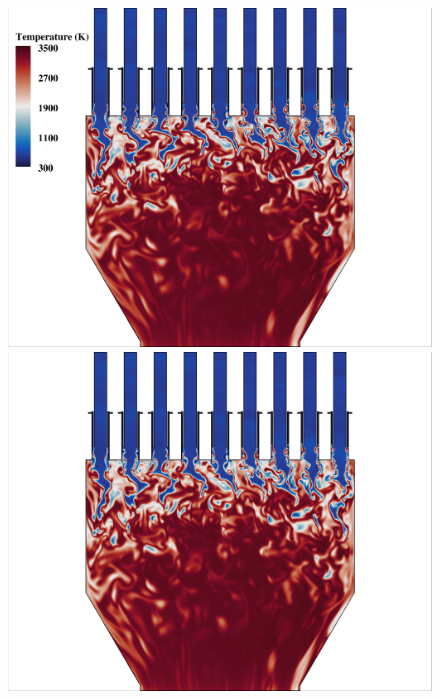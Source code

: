 \begin{figure}
	{\begin{minipage}{0.32\linewidth}
		\includegraphics[width=0.99\linewidth,trim={0.5em 0.5em 15.0em 0.5em},clip]{Chapters/HPROMResults/Images/nineElem/unsampled/fom_temp_z.png}
	\end{minipage}
	\begin{minipage}{0.32\linewidth}
		\includegraphics[width=0.99\linewidth,trim={0.5em 0.5em 15.0em 0.5em},clip]{Chapters/HPROMResults/Images/nineElem/unsampled/rom_k25_temp_z.png}
	\end{minipage}
	\begin{minipage}{0.32\linewidth}

\end{minipage}}
\end{figure}
